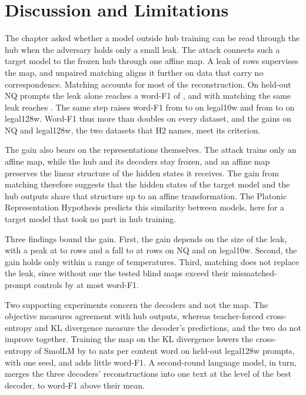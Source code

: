 \section{Discussion and Limitations}\label{sec:attack:discussion}

The chapter asked whether a model outside hub training can be read through the hub when the adversary holds only a small leak.
The attack connects such a target model to the frozen hub through one affine map.
A leak of  rows supervises the map, and unpaired matching aligns it further on data that carry no correspondence.
Matching accounts for most of the reconstruction.
On held-out NQ prompts the leak alone reaches a word-F1 of , and with matching the same leak reaches . %
The same step raises word-F1 from  to  on legal10w and from  to  on legal128w. %
Word-F1 thus more than doubles on every dataset, and the gains on NQ and legal128w, the two datasets that H2 names, meet its criterion.

The gain also bears on the representations themselves.
The attack trains only an affine map, while the hub and its decoders stay frozen, and an affine map preserves the linear structure of the hidden states it receives.
The gain from matching therefore suggests that the hidden states of the target model and the hub outputs share that structure up to an affine transformation.
The Platonic Representation Hypothesis predicts this similarity between models, here for a target model that took no part in hub training.

Three findings bound the gain.
First, the gain depends on the size of the leak, with a peak at  to  rows and a fall to  at  rows on NQ and on legal10w. %
Second, the gain holds only within a range of temperatures.
Third, matching does not replace the leak, since without one the tested blind maps exceed their mismatched-prompt controls by at most  word-F1.

Two supporting experiments concern the decoders and not the map.
The objective measures agreement with hub outputs, whereas teacher-forced cross-entropy and KL divergence measure the decoder's predictions, and the two do not improve together.
Training the map on the KL divergence lowers the cross-entropy of SmolLM by  to  nats per content word on held-out legal128w prompts, with one seed, and adds little word-F1. %
A second-round language model, in turn, merges the three decoders' reconstructions into one text at the level of the best decoder,  to  word-F1 above their mean.

